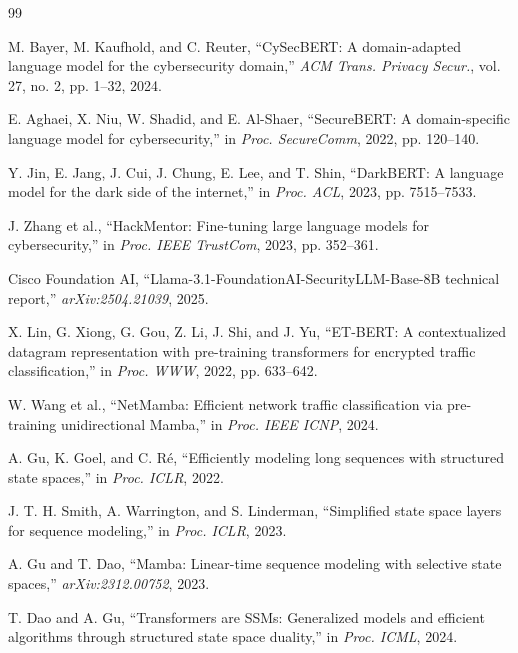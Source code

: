 \documentclass[journal]{IEEEtran}
\begin{document}

\begin{thebibliography}{99}

M. Bayer, M. Kaufhold, and C. Reuter, ``CySecBERT: A domain-adapted language model for the cybersecurity domain,'' \emph{ACM Trans. Privacy Secur.}, vol. 27, no. 2, pp. 1--32, 2024.

E. Aghaei, X. Niu, W. Shadid, and E. Al-Shaer, ``SecureBERT: A domain-specific language model for cybersecurity,'' in \emph{Proc. SecureComm}, 2022, pp. 120--140.

Y. Jin, E. Jang, J. Cui, J. Chung, E. Lee, and T. Shin, ``DarkBERT: A language model for the dark side of the internet,'' in \emph{Proc. ACL}, 2023, pp. 7515--7533.

J. Zhang et al., ``HackMentor: Fine-tuning large language models for cybersecurity,'' in \emph{Proc. IEEE TrustCom}, 2023, pp. 352--361.

Cisco Foundation AI, ``Llama-3.1-FoundationAI-SecurityLLM-Base-8B technical report,'' \emph{arXiv:2504.21039}, 2025.

X. Lin, G. Xiong, G. Gou, Z. Li, J. Shi, and J. Yu, ``ET-BERT: A contextualized datagram representation with pre-training transformers for encrypted traffic classification,'' in \emph{Proc. WWW}, 2022, pp. 633--642.

W. Wang et al., ``NetMamba: Efficient network traffic classification via pre-training unidirectional Mamba,'' in \emph{Proc. IEEE ICNP}, 2024.

A. Gu, K. Goel, and C. R\'{e}, ``Efficiently modeling long sequences with structured state spaces,'' in \emph{Proc. ICLR}, 2022.

J. T. H. Smith, A. Warrington, and S. Linderman, ``Simplified state space layers for sequence modeling,'' in \emph{Proc. ICLR}, 2023.

A. Gu and T. Dao, ``Mamba: Linear-time sequence modeling with selective state spaces,'' \emph{arXiv:2312.00752}, 2023.

T. Dao and A. Gu, ``Transformers are SSMs: Generalized models and efficient algorithms through structured state space duality,'' in \emph{Proc. ICML}, 2024.


\end{thebibliography}
\end{document}
